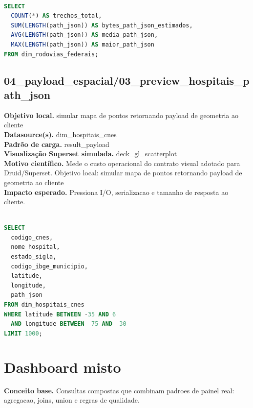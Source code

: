 \documentclass[11pt,a4paper]{article}
\begin{document}
\begin{lstlisting}[language=SQL]

SELECT
  COUNT(*) AS trechos_total,
  SUM(LENGTH(path_json)) AS bytes_path_json_estimados,
  AVG(LENGTH(path_json)) AS media_path_json,
  MAX(LENGTH(path_json)) AS maior_path_json
FROM dim_rodovias_federais;

\end{lstlisting}

\subsection{04\_payload\_espacial/03\_preview\_hospitais\_path\_json}

\textbf{Objetivo local.} simular mapa de pontos retornando payload de geometria ao cliente\\

\textbf{Datasource(s).} dim\_hospitais\_cnes\\

\textbf{Padrão de carga.} result\_payload\\

\textbf{Visualização Superset simulada.} deck\_gl\_scatterplot\\

\textbf{Motivo científico.} Mede o custo operacional do contrato visual adotado para Druid/Superset. Objetivo local: simular mapa de pontos retornando payload de geometria ao cliente\\

\textbf{Impacto esperado.} Pressiona I/O, serializacao e tamanho de resposta ao cliente.

\begin{lstlisting}[language=SQL]

SELECT
  codigo_cnes,
  nome_hospital,
  estado_sigla,
  codigo_ibge_municipio,
  latitude,
  longitude,
  path_json
FROM dim_hospitais_cnes
WHERE latitude BETWEEN -35 AND 6
  AND longitude BETWEEN -75 AND -30
LIMIT 1000;

\end{lstlisting}

\clearpage

\section{Dashboard misto}

\textbf{Conceito base.} Consultas compostas que combinam padroes de painel real: agregacao, joins, union e regras de qualidade.
\end{document}
